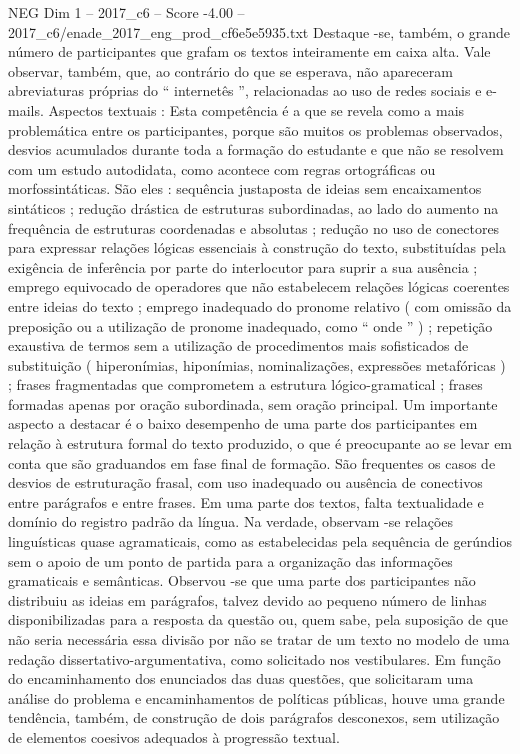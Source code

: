\begin{textsample}{NEG Dim 1 – 2017\_c6 – Score -4.00 – 2017\_c6/enade\_2017\_eng\_prod\_cf6e5e5935.txt}
Destaque -se, também, o grande número de participantes que grafam os textos inteiramente em caixa alta.
Vale observar, também, que, ao contrário do que se esperava, não apareceram abreviaturas próprias do “ internetês ”, relacionadas ao uso de redes sociais e e-mails.
Aspectos textuais : Esta competência é a que se revela como a mais problemática entre os participantes, porque são muitos os problemas observados, desvios acumulados durante toda a formação do estudante e que não se resolvem com um estudo autodidata, como acontece com regras ortográficas ou morfossintáticas.
São eles : sequência justaposta de ideias sem encaixamentos sintáticos ; redução drástica de estruturas subordinadas, ao lado do aumento na frequência de estruturas coordenadas e absolutas ; redução no uso de conectores para expressar relações lógicas essenciais à construção do texto, substituídas pela exigência de inferência por parte do interlocutor para suprir a sua ausência ; emprego equivocado de operadores que não estabelecem relações lógicas coerentes entre ideias do texto ; emprego inadequado do pronome relativo ( com omissão da preposição ou a utilização de pronome inadequado, como “ onde ” ) ; repetição exaustiva de termos sem a utilização de procedimentos mais sofisticados de substituição ( hiperonímias, hiponímias, nominalizações, expressões metafóricas ) ; frases fragmentadas que comprometem a estrutura lógico-gramatical ; frases formadas apenas por oração subordinada, sem oração principal.
Um importante aspecto a destacar é o baixo desempenho de uma parte dos participantes em relação à estrutura formal do texto produzido, o que é preocupante ao se levar em conta que são graduandos em fase final de formação.
São frequentes os casos de desvios de estruturação frasal, com uso inadequado ou ausência de conectivos entre parágrafos e entre frases.
Em uma parte dos textos, falta textualidade e domínio do registro padrão da língua.
Na verdade, observam -se relações linguísticas quase agramaticais, como as estabelecidas pela sequência de gerúndios sem o apoio de um ponto de partida para a organização das informações gramaticais e semânticas.
Observou -se que uma parte dos participantes não distribuiu as ideias em parágrafos, talvez devido ao pequeno número de linhas disponibilizadas para a resposta da questão ou, quem sabe, pela suposição de que não seria necessária essa divisão por não se tratar de um texto no modelo de uma redação dissertativo-argumentativa, como solicitado nos vestibulares.
Em função do encaminhamento dos enunciados das duas questões, que solicitaram uma análise do problema e encaminhamentos de políticas públicas, houve uma grande tendência, também, de construção de dois parágrafos desconexos, sem utilização de elementos coesivos adequados à progressão textual.

\end{textsample}
